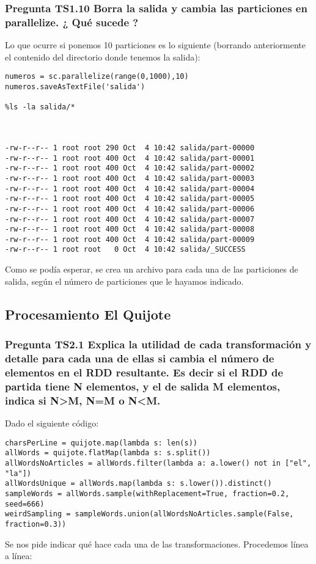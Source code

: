 \documentclass[11pt]{article}
\begin{document}
\subsubsection*{ Pregunta TS1.10 Borra la salida y cambia las particiones en parallelize. ¿ Qué sucede ?}

Lo que ocurre si ponemos 10 particiones es lo siguiente (borrando anteriormente el contenido del directorio donde tenemos la salida):
\begin{verbatim}
numeros = sc.parallelize(range(0,1000),10)
numeros.saveAsTextFile('salida')

%ls -la salida/*



-rw-r--r-- 1 root root 290 Oct  4 10:42 salida/part-00000
-rw-r--r-- 1 root root 400 Oct  4 10:42 salida/part-00001
-rw-r--r-- 1 root root 400 Oct  4 10:42 salida/part-00002
-rw-r--r-- 1 root root 400 Oct  4 10:42 salida/part-00003
-rw-r--r-- 1 root root 400 Oct  4 10:42 salida/part-00004
-rw-r--r-- 1 root root 400 Oct  4 10:42 salida/part-00005
-rw-r--r-- 1 root root 400 Oct  4 10:42 salida/part-00006
-rw-r--r-- 1 root root 400 Oct  4 10:42 salida/part-00007
-rw-r--r-- 1 root root 400 Oct  4 10:42 salida/part-00008
-rw-r--r-- 1 root root 400 Oct  4 10:42 salida/part-00009
-rw-r--r-- 1 root root   0 Oct  4 10:42 salida/_SUCCESS
\end{verbatim}

Como se podía esperar, se crea un archivo para cada una de las particiones de salida, según el número de particiones que le hayamos indicado.

\subsection{Procesamiento El Quijote}

\subsubsection*{ Pregunta TS2.1 Explica la utilidad de cada transformación y detalle para cada una de ellas si cambia el número de elementos en el RDD resultante. Es decir si el RDD de partida tiene N elementos, y el de salida M elementos, indica si N>M, N=M o N<M.}

Dado el siguiente código:
\begin{verbatim}
charsPerLine = quijote.map(lambda s: len(s))
allWords = quijote.flatMap(lambda s: s.split())
allWordsNoArticles = allWords.filter(lambda a: a.lower() not in ["el", "la"])
allWordsUnique = allWords.map(lambda s: s.lower()).distinct()
sampleWords = allWords.sample(withReplacement=True, fraction=0.2, seed=666)
weirdSampling = sampleWords.union(allWordsNoArticles.sample(False, fraction=0.3))
\end{verbatim}
Se nos pide indicar qué hace cada una de las transformaciones. Procedemos línea a línea:
\end{document}
